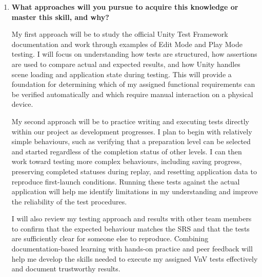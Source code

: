 \documentclass[10pt,titlepage]{article}
\begin{document}
\begin{enumerate}
    \item \textbf{What approaches will you pursue to acquire this
    knowledge or master this skill, and why?}

    My first approach will be to study the official Unity
    Test Framework documentation and work through examples
    of Edit Mode and Play Mode testing. I will focus on
    understanding how tests are structured, how assertions
    are used to compare actual and expected results, and
    how Unity handles scene loading and application state
    during testing. This will provide a foundation for
    determining which of my assigned functional requirements
    can be verified automatically and which require manual
    interaction on a physical device.

    My second approach will be to practice writing and
    executing tests directly within our \progname{} project
    as development progresses. I plan to begin with
    relatively simple behaviours, such as verifying
    that a preparation level can be selected and started
    regardless of the completion status of other levels.
    I can then work toward testing more complex behaviours,
    including saving progress, preserving completed
    statuses during replay, and resetting application
    data to reproduce first-launch conditions.
    Running these tests against the actual application
    will help me identify limitations in my understanding
    and improve the reliability of the test procedures.

    I will also review my testing approach and results
    with other team members to confirm that the expected
    behaviour matches the SRS and that the tests are
    sufficiently clear for someone else to reproduce.
    Combining documentation-based learning with hands-on
    practice and peer feedback will help me develop the
    skills needed to execute my assigned VnV tests
    effectively and document trustworthy results.

\end{enumerate}


\newpage



\end{document}
